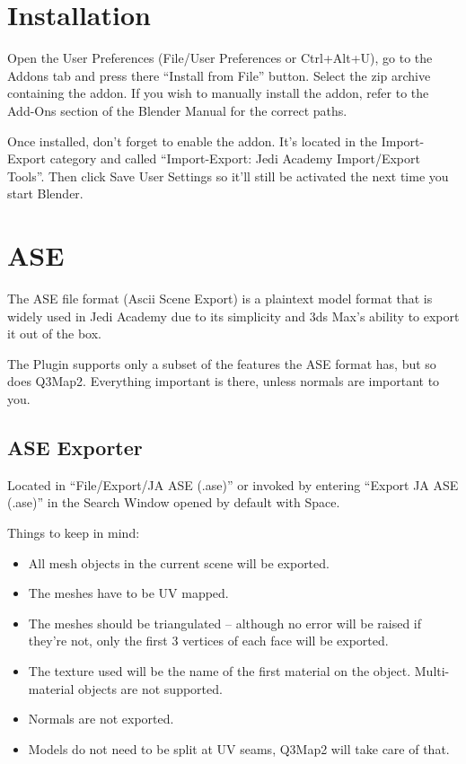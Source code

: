 \documentclass[a4paper,10pt]{article}
\begin{document}
 \section{Installation}
 
 Open the User Preferences (File/User Preferences or Ctrl+Alt+U), go to the Addons tab and press there
 ``Install from File'' button. Select the zip archive containing the addon. If you wish to manually install the
 addon, refer to the Add-Ons section of the Blender Manual for the correct paths.
 
 Once installed, don't forget to enable the addon. It's located in the Import-Export category and called
 ``Import-Export: Jedi Academy Import/Export Tools''. Then click Save User Settings so it'll still be activated
 the next time you start Blender.
 
 \section{ASE}
 
 The ASE file format (Ascii Scene Export) is a plaintext model format that is widely used in Jedi Academy due
 to its simplicity and 3ds Max's ability to export it out of the box.
 
 The Plugin supports only a subset of the features the ASE format has, but so does Q3Map2. Everything important
 is there, unless normals are important to you.
 
 \subsection{ASE Exporter}
 
 Located in ``File/Export/JA ASE (.ase)'' or invoked by entering ``Export JA ASE (.ase)'' in the Search Window
 opened by default with Space.
 
 Things to keep in mind:
 \begin{itemize}
  \item All mesh objects in the current scene will be exported.
  \item The meshes have to be UV mapped.
  \item The meshes should be triangulated -- although no error will be raised if they're not, only the first
  3 vertices of each face will be exported.
  \item The texture used will be the name of the first material on the object. Multi-material objects are not
  supported.
  \item Normals are not exported.
  \item Models do not need to be split at UV seams, Q3Map2 will take care of that.
 \end{itemize}
 
\end{document}
